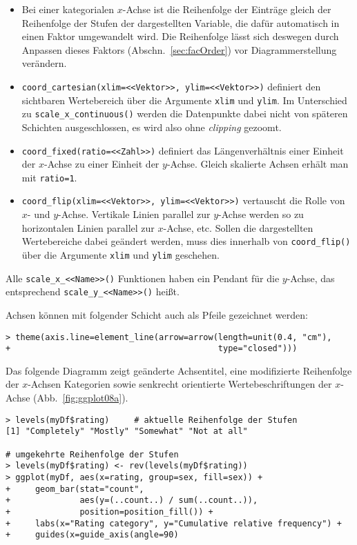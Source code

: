 \begin{itemize}
\item Bei einer kategorialen $x$-Achse ist die Reihenfolge der Einträge gleich der Reihenfolge der Stufen der dargestellten Variable, die dafür automatisch in einen Faktor umgewandelt wird. Die Reihenfolge lässt sich deswegen durch Anpassen dieses Faktors (Abschn.\ \ref{sec:facOrder}) vor Diagrammerstellung verändern. %
\item {} \lstinline!coord_cartesian(xlim=<<Vektor>>, ylim=<<Vektor>>)! definiert den sichtbaren Wertebereich über die Argumente \lstinline!xlim! und \lstinline!ylim!. Im Unterschied zu \lstinline!scale_x_continuous()! werden die Datenpunkte dabei nicht von späteren Schichten ausgeschlossen, es wird also ohne \emph{clipping} gezoomt.
\item {} \lstinline!coord_fixed(ratio=<<Zahl>>)! definiert das Längenverhältnis einer Einheit der $x$-Achse zu einer Einheit der $y$-Achse. Gleich skalierte Achsen erhält man mit \lstinline!ratio=1!.
\item {} \lstinline!coord_flip(xlim=<<Vektor>>, ylim=<<Vektor>>)! vertauscht die Rolle von $x$- und $y$-Achse. Vertikale Linien parallel zur $y$-Achse werden so zu horizontalen Linien parallel zur $x$-Achse, etc. Sollen die dargestellten Wertebereiche dabei geändert werden, muss dies innerhalb von \lstinline!coord_flip()! über die Argumente \lstinline!xlim! und \lstinline!ylim! geschehen.
\end{itemize}

Alle \lstinline!scale_x_<<Name>>()! Funktionen haben ein Pendant für die $y$-Achse, das entsprechend \lstinline!scale_y_<<Name>>()! heißt.

Achsen können mit folgender Schicht auch als Pfeile gezeichnet werden:
\begin{lstlisting}
> theme(axis.line=element_line(arrow=arrow(length=unit(0.4, "cm"),
+                                          type="closed")))
\end{lstlisting}

Das folgende Diagramm zeigt geänderte Achsentitel, eine modifizierte Reihenfolge der $x$-Achsen Kategorien sowie senkrecht orientierte Wertebeschriftungen der $x$-Achse (Abb.\ \ref{fig:ggplot08a}).
\begin{lstlisting}
> levels(myDf$rating)     # aktuelle Reihenfolge der Stufen
[1] "Completely" "Mostly" "Somewhat" "Not at all"

# umgekehrte Reihenfolge der Stufen
> levels(myDf$rating) <- rev(levels(myDf$rating))
> ggplot(myDf, aes(x=rating, group=sex, fill=sex)) +
+     geom_bar(stat="count",
+              aes(y=(..count..) / sum(..count..)),
+              position=position_fill()) +
+     labs(x="Rating category", y="Cumulative relative frequency") +
+     guides(x=guide_axis(angle=90)
\end{lstlisting}

